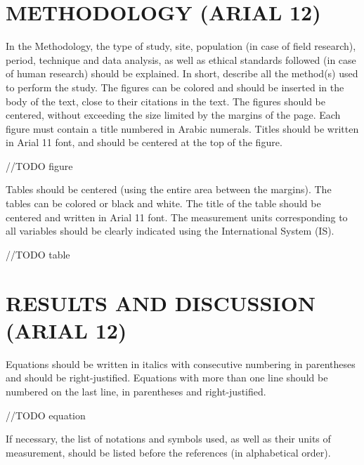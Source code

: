 \documentclass[
	article,			%
	12pt,				%
	oneside,			%
	a4paper,			%
	english,			%
	brazil,				%
	sumario=tradicional
	]{abntex2}
\begin{document}
\section{\textbf{METHODOLOGY (ARIAL 12)}}

In the Methodology, the type of study, site, population (in case of field research), period, technique and data analysis, as well as ethical standards followed (in case of human research) should be explained. In short, describe all the method(s) used to perform the study.
The figures can be colored and should be inserted in the body of the text, close to their citations in the text. The figures should be centered, without exceeding the size limited by the margins of the page.
Each figure must contain a title numbered in Arabic numerals. Titles should be written in Arial 11 font, and should be centered at the top of the figure.

//TODO figure

Tables should be centered (using the entire area between the margins). The tables can be colored or black and white. The title of the table should be centered and written in Arial 11 font. The measurement units corresponding to all variables should be clearly indicated using the International System (IS).


//TODO table

\section{\textbf{RESULTS AND DISCUSSION (ARIAL 12)}}

Equations should be written in italics with consecutive numbering in parentheses and should be right-justified. Equations with more than one line should be numbered on the last line, in parentheses and right-justified.



//TODO equation

If necessary, the list of notations and symbols used, as well as their units of measurement, should be listed before the references (in alphabetical order).



\end{document}
